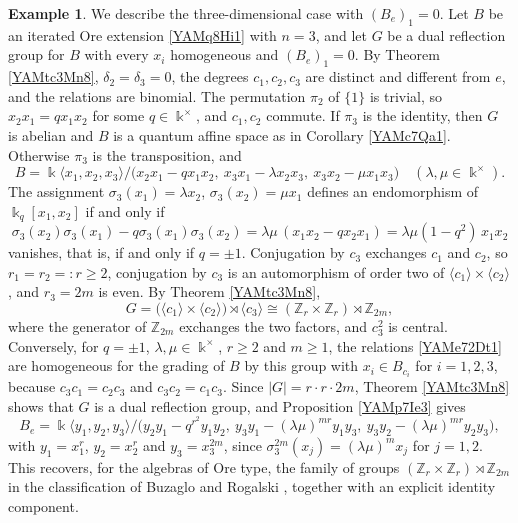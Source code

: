 \documentclass[reqno]{amsart}
\numberwithin{equation}{section}
\theoremstyle{definition}
\newtheorem{example}[equation]{Example}
\theoremstyle{remark}
\theoremstyle{plain}
\newcommand{\kk}{\Bbbk}
\begin{document}
\begin{example}\label{YAMc12Dt0}
We describe the three-dimensional case with $(B_e)_1=0$. Let $B$ be an iterated Ore extension \eqref{YAMq8Hi1} with $n=3$, and let $G$ be a dual reflection group for $B$ with every $x_i$ homogeneous and $(B_e)_1=0$. By Theorem \ref{YAMtc3Mn8}, $\delta_2=\delta_3=0$, the degrees $c_1,c_2,c_3$ are distinct and different from $e$, and the relations are binomial. The permutation $\pi_2$ of $\{1\}$ is trivial, so $x_2x_1=qx_1x_2$ for some $q\in\kk^\times$, and $c_1,c_2$ commute. If $\pi_3$ is the identity, then $G$ is abelian and $B$ is a quantum affine space as in Corollary \ref{YAMc7Qa1}. Otherwise $\pi_3$ is the transposition, and
\begin{equation}\label{YAMe72Dt1}
B=\kk\langle x_1,x_2,x_3\rangle/\big(x_2x_1-qx_1x_2,\ x_3x_1-\lambda x_2x_3,\ x_3x_2-\mu x_1x_3\big)\quad(\lambda,\mu\in\kk^\times).
\end{equation}
The assignment $\sigma_3(x_1)=\lambda x_2$, $\sigma_3(x_2)=\mu x_1$ defines an endomorphism of $\kk_q[x_1,x_2]$ if and only if
\[
\sigma_3(x_2)\sigma_3(x_1)-q\sigma_3(x_1)\sigma_3(x_2)=\lambda\mu\,(x_1x_2-qx_2x_1)=\lambda\mu(1-q^2)\,x_1x_2
\]
vanishes, that is, if and only if $q=\pm1$. Conjugation by $c_3$ exchanges $c_1$ and $c_2$, so $r_1=r_2=:r\ge2$, conjugation by $c_3$ is an automorphism of order two of $\langle c_1\rangle\times\langle c_2\rangle$, and $r_3=2m$ is even. By Theorem \ref{YAMtc3Mn8},
\[
G=\big(\langle c_1\rangle\times\langle c_2\rangle\big)\rtimes\langle c_3\rangle\cong(\mathbb Z_r\times\mathbb Z_r)\rtimes\mathbb Z_{2m},
\]
where the generator of $\mathbb Z_{2m}$ exchanges the two factors, and $c_3^2$ is central. Conversely, for $q=\pm1$, $\lambda,\mu\in\kk^\times$, $r\ge2$ and $m\ge1$, the relations \eqref{YAMe72Dt1} are homogeneous for the grading of $B$ by this group with $x_i\in B_{c_i}$ for $i=1,2,3$, because $c_3c_1=c_2c_3$ and $c_3c_2=c_1c_3$. Since $|G|=r\cdot r\cdot2m$, Theorem \ref{YAMtc3Mn8} shows that $G$ is a dual reflection group, and Proposition \ref{YAMp7Ie3} gives
\[
B_e=\kk\langle y_1,y_2,y_3\rangle/\big(y_2y_1-q^{r^2}y_1y_2,\ y_3y_1-(\lambda\mu)^{mr}y_1y_3,\ y_3y_2-(\lambda\mu)^{mr}y_2y_3\big),
\]
with $y_1=x_1^r$, $y_2=x_2^r$ and $y_3=x_3^{2m}$, since $\sigma_3^{2m}(x_j)=(\lambda\mu)^mx_j$ for $j=1,2$. This recovers, for the algebras of Ore type, the family of groups $(\mathbb Z_r\times\mathbb Z_r)\rtimes\mathbb Z_{2m}$ in the classification of Buzaglo and Rogalski \cite[Theorem 1.2]{BR}, together with an explicit identity component.
\end{example}
\end{document}
